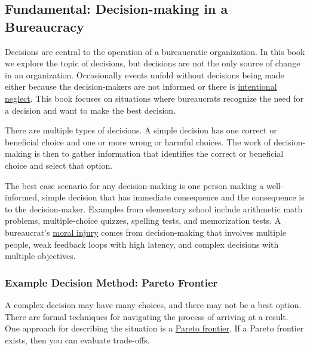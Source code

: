 \subsection*{Fundamental: Decision-making in a Bureaucracy\label{sec:decision-making}}

Decisions are central to the operation of a bureaucratic organization. In this book we explore the topic of decisions, but decisions are not the only source of change in an organization. Occasionally events unfold without decisions being made either because the decision-makers are not informed or there is  \href{https://en.wikipedia.org/wiki/Willful_blindness}{intentional neglect}. 
\iftoggle{WPinmargin}{\marginpar{[Wikipedia] Willful\\blindness}}{}
This book focuses on situations where bureaucrats recognize the need for a decision and want to make the best decision.

There are multiple types of decisions. 
A \gls{simple decision} \iftoggle{glossaryinmargin}{\marginpar{[Glossary]}}{}
has one correct or beneficial choice and one or more wrong or harmful choices. The work of decision-making is then to gather information that identifies the correct or beneficial choice and select that option.

The best case scenario for any decision-making is one person making a well-informed, simple decision that has immediate consequence and the consequence is to the decision-maker. Examples from elementary school include arithmetic math problems, multiple-choice quizzes, spelling tests, and memorization tests. A bureaucrat's \href{https://en.wikipedia.org/wiki/Moral_injury}{moral injury}
\iftoggle{WPinmargin}{\marginpar{[Wikipedia] moral\\injury}}{}
comes from decision-making that involves multiple people, weak feedback loops with high latency, and complex decisions with multiple objectives.

\subsubsection{Example Decision Method: Pareto Frontier\label{sec:pareto}}

A complex decision may have many choices, and there may not be a best option. There are formal techniques for navigating the process of arriving at a result. One approach for describing the situation is a \href{https://en.wikipedia.org/wiki/Pareto_front}{Pareto frontier}. 
\iftoggle{WPinmargin}{\marginpar{[Wikipedia] Pareto\\frontier}}{}
If a Pareto frontier exists, then you can evaluate trade-offs. 

